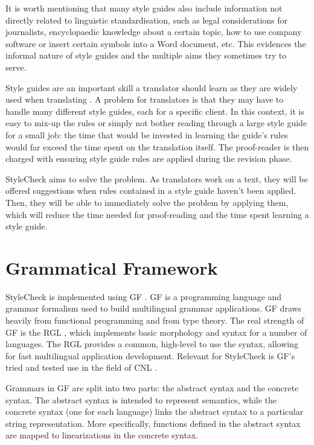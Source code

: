 It is worth mentioning that many style guides also include information not directly related to linguistic standardisation, such as legal considerations for journalists, encyclopaedic knowledge about a certain topic, how to use company software or insert certain symbols into a Word document, etc. This evidences the informal nature of style guides and the multiple aims they sometimes try to serve.

Style guides are an important skill a translator should learn as they are widely used when translating \parencite{washbourne2012style}. A problem for translators is that they may have to handle many different style guides, each for a specific client. In this context, it is easy to mix-up the rules or simply not bother reading through a large style guide for a small job: the time that would be invested in learning the guide's rules would far exceed the time spent on the translation itself. The proof-reader is then charged with ensuring style guide rules are applied during the revision phase.

StyleCheck aims to solve the problem. As translators work on a text, they will be offered suggestions when rules contained in a style guide haven't been applied. Then, they will be able to immediately solve the problem by applying them, which will reduce the time needed for proof-reading and the time spent learning a style guide.


\section{Grammatical Framework}

\noindent StyleCheck is implemented using \ac{GF} \parencite{ranta2011gf}. \ac{GF} is a programming language and grammar formalism used to build multilingual grammar applications. \ac{GF} draws heavily from functional programming and from type theory. The real strength of \ac{GF} is the \ac{RGL} \parencite{ranta2009rgl}, which implements basic morphology and syntax for a number of languages. The \ac{RGL} provides a common, high-level  to use the syntax, allowing for fast multilingual application development. Relevant for StyleCheck is \ac{GF}'s tried and tested use in the field of \ac{CNL} \parencite{angelov2009cnl,kaljurand2013wiki,ranta2014embedded}.

Grammars in \ac{GF} are split into two parts: the abstract syntax and the concrete syntax. The abstract syntax is intended to represent semantics, while the concrete syntax (one for each language) links the abstract syntax to a particular string representation. More specifically, functions defined in the abstract syntax are mapped to linearizations in the concrete syntax. 


